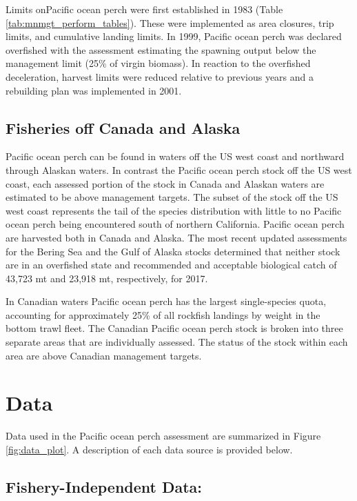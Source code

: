 \documentclass[12pt,]{article}
\begin{document}
Limits onPacific ocean perch were first established in 1983 (Table
\ref{tab:mnmgt_perform_tables}). These were implemented as area
closures, trip limits, and cumulative landing limits. In 1999, Pacific
ocean perch was declared overfished with the assessment estimating the
spawning output below the management limit (25\% of virgin biomass). In
reaction to the overfished deceleration, harvest limits were reduced
relative to previous years and a rebuilding plan was implemented in
2001.

\subsection{Fisheries off Canada and
Alaska}\label{fisheries-off-canada-and-alaska}

Pacific ocean perch can be found in waters off the US west coast and
northward through Alaskan waters. In contrast the Pacific ocean perch
stock off the US west coast, each assessed portion of the stock in
Canada and Alaskan waters are estimated to be above management targets.
The subset of the stock off the US west coast represents the tail of the
species distribution with little to no Pacific ocean perch being
encountered south of northern California. Pacific ocean perch are
harvested both in Canada and Alaska. The most recent updated assessments
for the Bering Sea and the Gulf of Alaska stocks determined that neither
stock are in an overfished state and recommended and acceptable
biological catch of 43,723 mt and 23,918 mt, respectively, for 2017.

In Canadian waters Pacific ocean perch has the largest single-species
quota, accounting for approximately 25\% of all rockfish landings by
weight in the bottom trawl fleet. The Canadian Pacific ocean perch stock
is broken into three separate areas that are individually assessed. The
status of the stock within each area are above Canadian management
targets.

\section{Data}\label{data}

Data used in the Pacific ocean perch assessment are summarized in Figure
\ref{fig:data_plot}. A description of each data source is provided
below.

\subsection{Fishery-Independent Data:}\label{fishery-independent-data}
\end{document}
